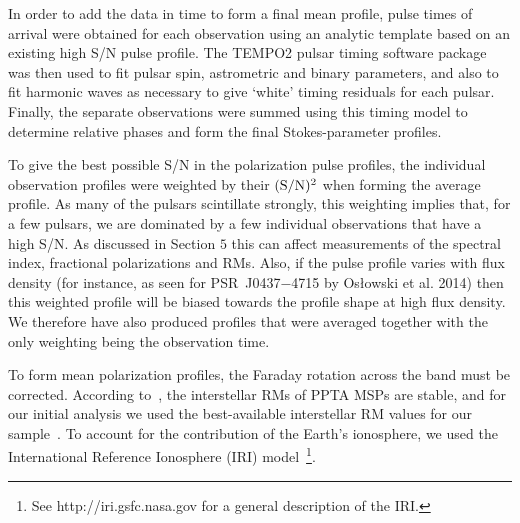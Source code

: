 \documentclass[useAMS,usenatbib]{mn2e}
\begin{document}
In order to add the data in time to form a final mean profile, pulse times of arrival 
were obtained for each observation using an analytic template based on an existing 
high S/N pulse profile. The TEMPO2 pulsar timing software package~\citep{Hobbs06}  
was then used to fit pulsar spin, astrometric and binary parameters, and also to fit 
harmonic waves as necessary to give ‘white’ timing residuals for each pulsar. Finally, 
the separate observations were summed using this timing model to determine relative 
phases and form the final Stokes-parameter profiles. 
%

To give the best possible S/N in the polarization pulse profiles, the individual 
observation profiles were weighted by their $(\rm{S/N})^2$ when forming the average profile. 
%
As many of the pulsars scintillate strongly, this weighting implies that, for a few pulsars, 
we are dominated by a few individual observations that have a high S/N. As discussed in 
Section $5$ this can affect measurements of the spectral index, fractional polarizations and 
RMs. Also, if the pulse profile varies with flux density (for instance, 
as seen for PSR~J0437$-$4715 by Os{\l}owski et al. 2014) then this weighted profile will be 
biased towards the profile shape at high flux density. We therefore have also produced 
profiles that were averaged together with the only weighting being the observation time. 

To form mean polarization profiles, the Faraday rotation across the band must be 
corrected. 
%
According to~\citet{Yan11b}, the interstellar RMs of PPTA MSPs are stable, and for our initial analysis we 
used the best-available interstellar RM values for our sample~\citep{Keith11,Yan11,Keith12,Burgay13}.
%
To account for the contribution of the Earth's ionosphere, we used the International 
Reference Ionosphere (IRI) model~\footnote{See http://iri.gsfc.nasa.gov for a general description
of the IRI.}. 
%
%
\end{document}
